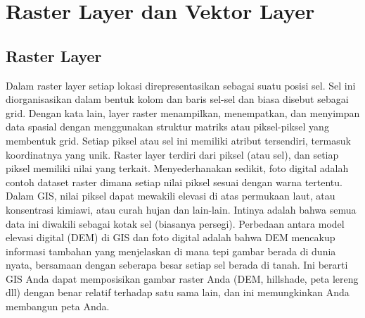 

\section{Raster Layer dan Vektor Layer}

\subsection{Raster Layer}
Dalam raster layer  setiap lokasi direpresentasikan sebagai suatu posisi sel. 
Sel ini diorganisasikan dalam bentuk kolom dan baris sel-sel dan biasa disebut sebagai grid. 
Dengan kata lain,  layer raster menampilkan, menempatkan, 
dan menyimpan data spasial dengan menggunakan struktur matriks atau piksel-piksel yang membentuk grid. 
Setiap piksel atau sel ini memiliki atribut tersendiri, termasuk koordinatnya yang unik.
Raster layer terdiri dari piksel (atau sel), dan setiap piksel memiliki nilai yang terkait. Menyederhanakan sedikit, foto digital adalah contoh dataset raster dimana setiap nilai piksel sesuai dengan warna tertentu. Dalam GIS, nilai piksel dapat mewakili elevasi di atas permukaan laut, atau konsentrasi kimiawi, atau curah hujan dan lain-lain. Intinya adalah bahwa semua data ini diwakili sebagai kotak sel (biasanya persegi). Perbedaan antara model elevasi digital (DEM) di GIS dan foto digital adalah bahwa DEM mencakup informasi tambahan yang menjelaskan di mana tepi gambar berada di dunia nyata, bersamaan dengan seberapa besar setiap sel berada di tanah. Ini berarti GIS Anda dapat memposisikan gambar raster Anda (DEM, hillshade, peta lereng dll) dengan benar relatif terhadap satu sama lain, dan ini memungkinkan Anda membangun peta Anda.


